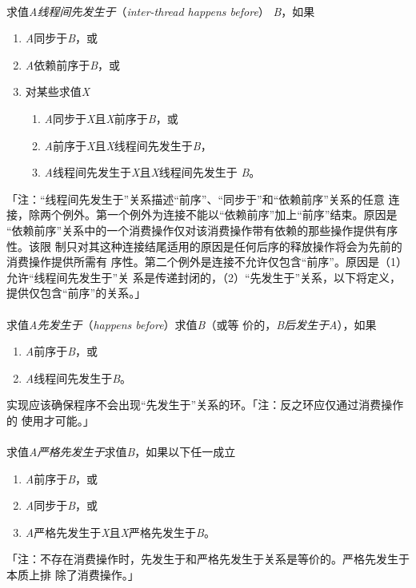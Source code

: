 \paragraph{}
求值\textit{A}\textit{线程间先发生于}（\textit{inter-thread happens before}）
\textit{B}，如果
\begin{enumerate}
  \item{\textit{A}同步于\textit{B}，或}
  \item{\textit{A}依赖前序于\textit{B}，或}
  \item{对某些求值\textit{X}
      \begin{enumerate}
        \item{\textit{A}同步于\textit{X}且\textit{X}前序于\textit{B}，或}
        \item{\textit{A}前序于\textit{X}且\textit{X}线程间先发生于\textit{B}，}
        \item{\textit{A}线程间先发生于\textit{X}且\textit{X}线程间先发生于
          \textit{B}。}
      \end{enumerate}
    }
\end{enumerate}
「注：``线程间先发生于''关系描述``前序''、``同步于''和``依赖前序''关系的任意
连接，除两个例外。第一个例外为连接不能以``依赖前序''加上``前序''结束。原因是
``依赖前序''关系中的一个消费操作仅对该消费操作带有依赖的那些操作提供有序性。该限
制只对其这种连接结尾适用的原因是任何后序的释放操作将会为先前的消费操作提供所需有
序性。第二个例外是连接不允许仅包含``前序''。原因是（1）允许``线程间先发生于''关
系是传递封闭的，（2）``先发生于''关系，以下将定义，提供仅包含``前序''的关系。」

\paragraph{}
求值\textit{A}\textit{先发生于}（\textit{happens before}）求值\textit{B}（或等
价的，\textit{B}\textit{后发生于}\textit{A}），如果
\begin{enumerate}
  \item{\textit{A}前序于\textit{B}，或}
  \item{\textit{A}线程间先发生于\textit{B}。}
\end{enumerate}
实现应该确保程序不会出现``先发生于''关系的环。「注：反之环应仅通过消费操作的
使用才可能。」

\paragraph{}
求值\textit{A}\textit{严格先发生于}求值\textit{B}，如果以下任一成立
\begin{enumerate}
  \item{\textit{A}前序于\textit{B}，或}
  \item{\textit{A}同步于\textit{B}，或}
  \item{\textit{A}严格先发生于\textit{X}且\textit{X}严格先发生于\textit{B}。}
\end{enumerate}
「注：不存在消费操作时，先发生于和严格先发生于关系是等价的。严格先发生于本质上排
除了消费操作。」

